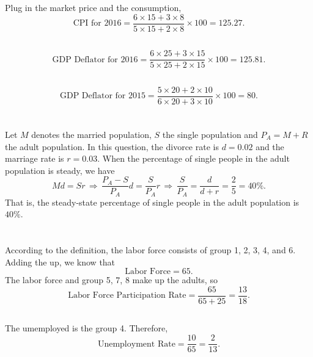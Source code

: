 \documentclass{article}
\begin{document}
\section{}
\subsection{}
Plug in the market price and the consumption,
\[
    \text{CPI for 2016} =
    \frac{6 \times 15 + 3 \times 8}{5 \times 15 + 2 \times 8} \times 100 = 125.27 .
\]

\subsection{}
\[
    \text{GDP Deflator for 2016} = 
    \frac{6 \times 25 + 3 \times 15}{5 \times 25 + 2 \times 15} \times 100 = 125.81 .
\]

\subsection{}
\[
    \text{GDP Deflator for 2015} = 
    \frac{5 \times 20 + 2 \times 10}{6 \times 20 + 3 \times 10} \times 100 = 80 .
\]

\section{}
Let $M$ denotes the married population, $S$ the single population and $P_A = M+R$ the adult population. In this question, the divorce rate is $d = 0.02$ and the marriage rate is $r = 0.03$. When the percentage of single people in the adult population is steady, we have
\[
    Md = Sr
    \, \Longrightarrow \,
    \frac{P_A - S}{P_A} d = \frac{S}{P_A} r
    \, \Longrightarrow \,
    \frac{S}{P_A} = \frac{d}{d + r}
    = \frac{2}{5} = 40 \%. 
\]
That is, the steady-state percentage of
single people in the adult population is $40 \%$.

\section{}
\subsection{}
According to the definition, the labor force consists of group 1, 2, 3, 4, and 6. Adding the up, we know that
\[
    \text{Labor Force} = 65 .
\]
The labor force and group 5, 7, 8 make up the adults, so
\[
    \text{Labor Force Participation Rate}
    = \frac{65}{65 + 25} = \frac{13}{18}.
\]

\subsection{}
The umemployed is the group 4. Therefore,
\[
    \text{Unemployment Rate} = \frac{10}{65} = \frac{2}{13}.
\]
\end{document}
